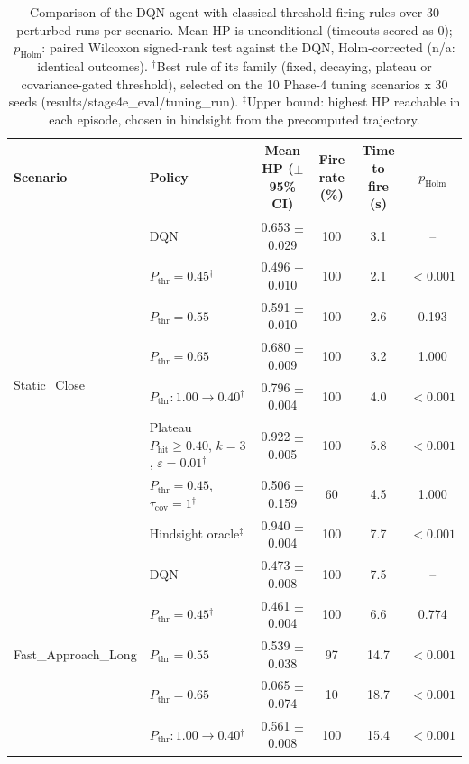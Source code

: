 \begin{table}[htbp]
\centering
\caption{Comparison of the DQN agent with classical threshold firing rules over 30 perturbed runs per scenario. Mean HP is unconditional (timeouts scored as 0); $p_{\mathrm{Holm}}$: paired Wilcoxon signed-rank test against the DQN, Holm-corrected (n/a: identical outcomes). $^{\dagger}$Best rule of its family (fixed, decaying, plateau or covariance-gated threshold), selected on the 10 Phase-4 tuning scenarios x 30 seeds (results/stage4e_eval/tuning_run). $^{\ddagger}$Upper bound: highest HP reachable in each episode, chosen in hindsight from the precomputed trajectory.}
\label{tab:comparison-traditional-rl}
\small
\begin{tabular}{llcccc}
\toprule
\textbf{Scenario} & \textbf{Policy} & \textbf{Mean HP ($\pm$95\% CI)} & \textbf{Fire rate (\%)} & \textbf{Time to fire (s)} & $p_{\mathrm{Holm}}$ \\
\midrule
\multirow{8}{*}{Static\_Close} & DQN & 0.653 $\pm$ 0.029 & 100 & 3.1 & -- \\
 & $P_{\mathrm{thr}}=0.45$$^{\dagger}$ & 0.496 $\pm$ 0.010 & 100 & 2.1 & $<0.001$ \\
 & $P_{\mathrm{thr}}=0.55$ & 0.591 $\pm$ 0.010 & 100 & 2.6 & 0.193 \\
 & $P_{\mathrm{thr}}=0.65$ & 0.680 $\pm$ 0.009 & 100 & 3.2 & 1.000 \\
 & $P_{\mathrm{thr}}: 1.00 \to 0.40$$^{\dagger}$ & 0.796 $\pm$ 0.004 & 100 & 4.0 & $<0.001$ \\
 & Plateau $P_{\mathrm{hit}}\geq0.40$, $k=3$, $\varepsilon=0.01$$^{\dagger}$ & 0.922 $\pm$ 0.005 & 100 & 5.8 & $<0.001$ \\
 & $P_{\mathrm{thr}}=0.45$, $\tau_{\mathrm{cov}}=1$$^{\dagger}$ & 0.506 $\pm$ 0.159 & 60 & 4.5 & 1.000 \\
 & Hindsight oracle$^{\ddagger}$ & 0.940 $\pm$ 0.004 & 100 & 7.7 & $<0.001$ \\
\midrule
\multirow{8}{*}{Fast\_Approach\_Long} & DQN & 0.473 $\pm$ 0.008 & 100 & 7.5 & -- \\
 & $P_{\mathrm{thr}}=0.45$$^{\dagger}$ & 0.461 $\pm$ 0.004 & 100 & 6.6 & 0.774 \\
 & $P_{\mathrm{thr}}=0.55$ & 0.539 $\pm$ 0.038 & 97 & 14.7 & $<0.001$ \\
 & $P_{\mathrm{thr}}=0.65$ & 0.065 $\pm$ 0.074 & 10 & 18.7 & $<0.001$ \\
 & $P_{\mathrm{thr}}: 1.00 \to 0.40$$^{\dagger}$ & 0.561 $\pm$ 0.008 & 100 & 15.4 & $<0.001$ \\

\end{tabular}
\end{table}
